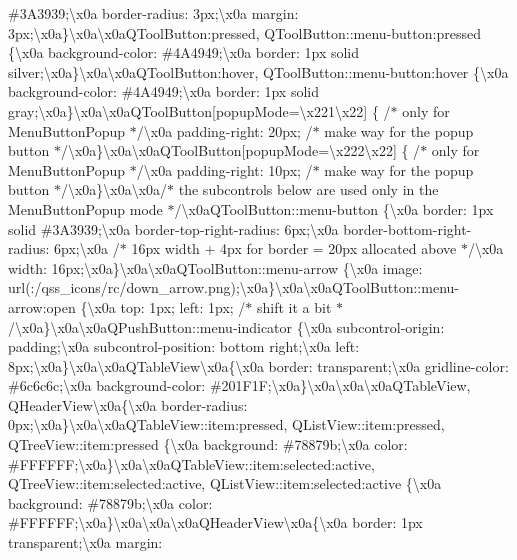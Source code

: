 \#3\+A3939;\textbackslash{}x0a border-\/radius\+: 3px;\textbackslash{}x0a margin\+: 3px;\textbackslash{}x0a\}\textbackslash{}x0a\textbackslash{}x0a\+Q\+Tool\+Button\+:pressed, Q\+Tool\+Button\+::menu-\/button\+:pressed \{\textbackslash{}x0a background-\/color\+: \#4\+A4949;\textbackslash{}x0a border\+: 1px solid silver;\textbackslash{}x0a\}\textbackslash{}x0a\textbackslash{}x0a\+Q\+Tool\+Button\+:hover, Q\+Tool\+Button\+::menu-\/button\+:hover \{\textbackslash{}x0a background-\/color\+: \#4\+A4949;\textbackslash{}x0a border\+: 1px solid gray;\textbackslash{}x0a\}\textbackslash{}x0a\textbackslash{}x0a\+Q\+Tool\+Button\mbox{[}popup\+Mode=\textbackslash{}x221\textbackslash{}x22\mbox{]} \{ /$\ast$ only for Menu\+Button\+Popup $\ast$/\textbackslash{}x0a padding-\/right\+: 20px; /$\ast$ make way for the popup button $\ast$/\textbackslash{}x0a\}\textbackslash{}x0a\textbackslash{}x0a\+Q\+Tool\+Button\mbox{[}popup\+Mode=\textbackslash{}x222\textbackslash{}x22\mbox{]} \{ /$\ast$ only for Menu\+Button\+Popup $\ast$/\textbackslash{}x0a padding-\/right\+: 10px; /$\ast$ make way for the popup button $\ast$/\textbackslash{}x0a\}\textbackslash{}x0a\textbackslash{}x0a/$\ast$ the subcontrols below are used only in the Menu\+Button\+Popup mode $\ast$/\textbackslash{}x0a\+Q\+Tool\+Button\+::menu-\/button \{\textbackslash{}x0a border\+: 1px solid \#3\+A3939;\textbackslash{}x0a border-\/top-\/right-\/radius\+: 6px;\textbackslash{}x0a border-\/bottom-\/right-\/radius\+: 6px;\textbackslash{}x0a /$\ast$ 16px width + 4px for border = 20px allocated above $\ast$/\textbackslash{}x0a width\+: 16px;\textbackslash{}x0a\}\textbackslash{}x0a\textbackslash{}x0a\+Q\+Tool\+Button\+::menu-\/arrow \{\textbackslash{}x0a image\+: url(\+:/qss\+\_\+icons/rc/down\+\_\+arrow.\+png);\textbackslash{}x0a\}\textbackslash{}x0a\textbackslash{}x0a\+Q\+Tool\+Button\+::menu-\/arrow\+:open \{\textbackslash{}x0a top\+: 1px; left\+: 1px; /$\ast$ shift it a bit $\ast$/\textbackslash{}x0a\}\textbackslash{}x0a\textbackslash{}x0a\+Q\+Push\+Button\+::menu-\/indicator \{\textbackslash{}x0a subcontrol-\/origin\+: padding;\textbackslash{}x0a subcontrol-\/position\+: bottom right;\textbackslash{}x0a left\+: 8px;\textbackslash{}x0a\}\textbackslash{}x0a\textbackslash{}x0a\+Q\+Table\+View\textbackslash{}x0a\{\textbackslash{}x0a border\+: transparent;\textbackslash{}x0a gridline-\/color\+: \#6c6c6c;\textbackslash{}x0a background-\/color\+: \#201\+F1\+F;\textbackslash{}x0a\}\textbackslash{}x0a\textbackslash{}x0a\textbackslash{}x0a\+Q\+Table\+View, Q\+Header\+View\textbackslash{}x0a\{\textbackslash{}x0a border-\/radius\+: 0px;\textbackslash{}x0a\}\textbackslash{}x0a\textbackslash{}x0a\+Q\+Table\+View\+::item\+:pressed, Q\+List\+View\+::item\+:pressed, Q\+Tree\+View\+::item\+:pressed \{\textbackslash{}x0a background\+: \#78879b;\textbackslash{}x0a color\+: \#\+F\+F\+F\+F\+F\+F;\textbackslash{}x0a\}\textbackslash{}x0a\textbackslash{}x0a\+Q\+Table\+View\+::item\+:selected\+:active, Q\+Tree\+View\+::item\+:selected\+:active, Q\+List\+View\+::item\+:selected\+:active \{\textbackslash{}x0a background\+: \#78879b;\textbackslash{}x0a color\+: \#\+F\+F\+F\+F\+F\+F;\textbackslash{}x0a\}\textbackslash{}x0a\textbackslash{}x0a\textbackslash{}x0a\+Q\+Header\+View\textbackslash{}x0a\{\textbackslash{}x0a border\+: 1px transparent;\textbackslash{}x0a margin\+: 